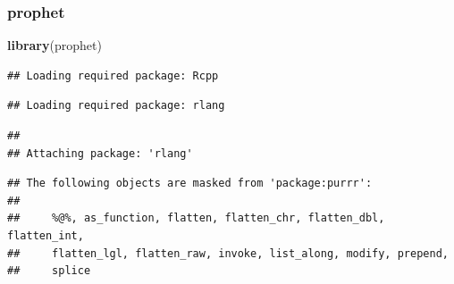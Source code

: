 \documentclass[
]{article}
\newenvironment{Shaded}{\begin{snugshade}}{\end{snugshade}}
\newcommand{\KeywordTok}[1]{\textcolor[rgb]{0.13,0.29,0.53}{\textbf{#1}}}
\newcommand{\NormalTok}[1]{#1}
\begin{document}
\hypertarget{prophet}{%
\subsubsection{prophet}\label{prophet}}

\begin{Shaded}
\begin{Highlighting}[]
\KeywordTok{library}\NormalTok{(prophet)}
\end{Highlighting}
\end{Shaded}

\begin{verbatim}
## Loading required package: Rcpp
\end{verbatim}

\begin{verbatim}
## Loading required package: rlang
\end{verbatim}

\begin{verbatim}
## 
## Attaching package: 'rlang'
\end{verbatim}

\begin{verbatim}
## The following objects are masked from 'package:purrr':
## 
##     %@%, as_function, flatten, flatten_chr, flatten_dbl, flatten_int,
##     flatten_lgl, flatten_raw, invoke, list_along, modify, prepend,
##     splice
\end{verbatim}
\end{document}
